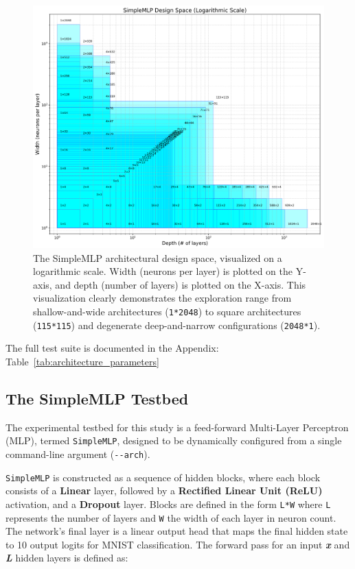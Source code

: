 \documentclass[conference]{IEEEtran}
\begin{document}
\begin{figure}[ht]
\centering
\includegraphics[width=\columnwidth]{SimpleMLP_Testing_Design_Space.png}
\caption{The SimpleMLP architectural design space, visualized on a logarithmic scale. Width (neurons per layer) is plotted on the Y-axis, and depth (number of layers) is plotted on the X-axis. This visualization clearly demonstrates the exploration range from shallow-and-wide architectures (\texttt{1*2048}) to square architectures (\texttt{115*115}) and degenerate deep-and-narrow configurations (\texttt{2048*1}).}
\label{fig:simplemlp_design_space}
\end{figure}

The full test suite is documented in the Appendix: Table~\ref{tab:architecture_parameters}

\subsection{The SimpleMLP Testbed}

The experimental testbed for this study is a feed-forward Multi-Layer Perceptron (MLP), termed \verb|SimpleMLP|, designed to be dynamically configured from a single command-line argument (\verb|--arch|).

\verb|SimpleMLP| is constructed as a sequence of hidden blocks, where each block consists of a \textbf{Linear} layer, followed by a \textbf{Rectified Linear Unit (ReLU)} activation, and a \textbf{Dropout} layer. Blocks are defined in the form \verb|L*W| where \verb|L| represents the number of layers and \verb|W| the width of each layer in neuron count. The network's final layer is a linear output head that maps the final hidden state to 10 output logits for MNIST classification. The forward pass for an input \textit{\textbf{x}} and \textit{\textbf{L}} hidden layers is defined as: 
\end{document}
